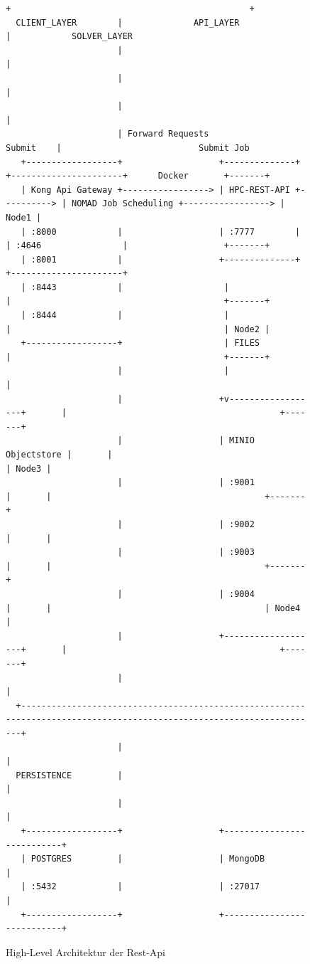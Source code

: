\documentclass[12pt]{article}
\begin{document}
\begin{figure}[h!]
  \centering
  \begin{Verbatim}[fontsize=\tiny,frame=single]
                      +                                               +
  CLIENT_LAYER        |              API_LAYER                        |            SOLVER_LAYER
                      |                                               |
                      |                                               |
                      |                                               |
                      | Forward Requests                    Submit    |                           Submit Job
   +------------------+                   +--------------+            +----------------------+      Docker       +-------+
   | Kong Api Gateway +-----------------> | HPC-REST-API +----------> | NOMAD Job Scheduling +-----------------> | Node1 |
   | :8000            |                   | :7777        |            | :4646                |                   +-------+
   | :8001            |                   +--------------+            +----------------------+
   | :8443            |                    |                          |                                          +-------+
   | :8444            |                    |                          |                                          | Node2 |
   +------------------+                    | FILES                    |                                          +-------+
                      |                    |                          |
                      |                   +v------------------+       |                                          +-------+
                      |                   | MINIO Objectstore |       |                                          | Node3 |
                      |                   | :9001             |       |                                          +-------+
                      |                   | :9002             |       |
                      |                   | :9003             |       |                                          +-------+
                      |                   | :9004             |       |                                          | Node4 |
                      |                   +-------------------+       |                                          +-------+
                      |                                               |
  +----------------------------------------------------------------------------------------------------------------------+
                      |                                               |
  PERSISTENCE         |                                               |
                      |                                               |
   +------------------+                   +---------------------------+
   | POSTGRES         |                   | MongoDB                   |
   | :5432            |                   | :27017                    |
   +------------------+                   +---------------------------+
  \end{Verbatim}


  \caption{High-Level Architektur der Rest-Api \cite{WinNT}}
  \label{}
\end{figure}
\end{document}
